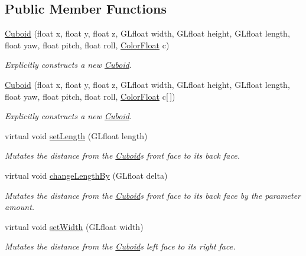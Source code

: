 \subsection*{Public Member Functions}
\begin{DoxyCompactItemize}
\item 
\hyperlink{classtsgl_1_1_cuboid_ac6fae2d4edcb10ea1478c840012f5c2a}{Cuboid} (float x, float y, float z, G\+Lfloat width, G\+Lfloat height, G\+Lfloat length, float yaw, float pitch, float roll, \hyperlink{structtsgl_1_1_color_float}{Color\+Float} c)
\begin{DoxyCompactList}\small\item\em Explicitly constructs a new \hyperlink{classtsgl_1_1_cuboid}{Cuboid}. \end{DoxyCompactList}\item 
\hyperlink{classtsgl_1_1_cuboid_aeae9324a13708f6e00d4423bd3ebba86}{Cuboid} (float x, float y, float z, G\+Lfloat width, G\+Lfloat height, G\+Lfloat length, float yaw, float pitch, float roll, \hyperlink{structtsgl_1_1_color_float}{Color\+Float} c\mbox{[}$\,$\mbox{]})
\begin{DoxyCompactList}\small\item\em Explicitly constructs a new \hyperlink{classtsgl_1_1_cuboid}{Cuboid}. \end{DoxyCompactList}\item 
virtual void \hyperlink{classtsgl_1_1_cuboid_a877809edb072286dd3157714fc2e405d}{set\+Length} (G\+Lfloat length)
\begin{DoxyCompactList}\small\item\em Mutates the distance from the \hyperlink{classtsgl_1_1_cuboid}{Cuboid}\textquotesingle{}s front face to its back face. \end{DoxyCompactList}\item 
virtual void \hyperlink{classtsgl_1_1_cuboid_ac8b9e098acd3b46dafae304f1288aa3d}{change\+Length\+By} (G\+Lfloat delta)
\begin{DoxyCompactList}\small\item\em Mutates the distance from the \hyperlink{classtsgl_1_1_cuboid}{Cuboid}\textquotesingle{}s front face to its back face by the parameter amount. \end{DoxyCompactList}\item 
virtual void \hyperlink{classtsgl_1_1_cuboid_a1bb873bf2fb9a51996219e5c6b013520}{set\+Width} (G\+Lfloat width)
\begin{DoxyCompactList}\small\item\em Mutates the distance from the \hyperlink{classtsgl_1_1_cuboid}{Cuboid}\textquotesingle{}s left face to its right face. \end{DoxyCompactList}\item 

\end{DoxyCompactItemize}
